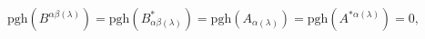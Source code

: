 \begin{equation}
\mathrm{pgh}\left( B^{\alpha \beta (\lambda )}\right) =\mathrm{pgh}\left(
B_{\alpha \beta (\lambda )}^{*}\right) =\mathrm{pgh}\left( A_{\alpha
(\lambda )}\right) =\mathrm{pgh}\left( A^{*\alpha (\lambda )}\right) =0,
\label{cin4}
\end{equation}

